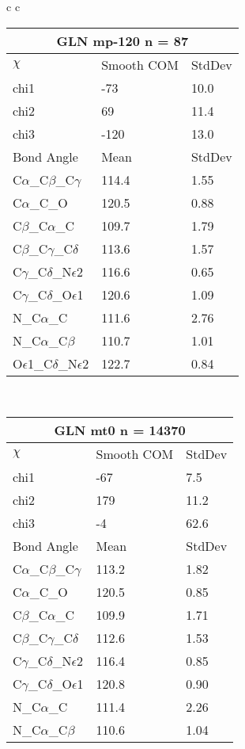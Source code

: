 \begin{longtable}{ c c }
\begin{tabular}{ l l l }
  \multicolumn{3}{c}{GLN \textbf{mp-120} n = 87} \\ \toprule
  $\chi$       & Smooth COM & StdDev \\ \midrule
  chi1 & -73 & 10.0 \\ 
  chi2 & 69 & 11.4 \\ 
  chi3 & -120 & 13.0 \\ \midrule
  Bond Angle   & Mean     & StdDev \\ \midrule
  C$\alpha$\_C$\beta$\_C$\gamma$ & 114.4 & 1.55\\
  C$\alpha$\_C\_O & 120.5 & 0.88\\
  C$\beta$\_C$\alpha$\_C & 109.7 & 1.79\\
  C$\beta$\_C$\gamma$\_C$\delta$ & 113.6 & 1.57\\
  C$\gamma$\_C$\delta$\_N$\epsilon$2 & 116.6 & 0.65\\
  C$\gamma$\_C$\delta$\_O$\epsilon$1 & 120.6 & 1.09\\
  N\_C$\alpha$\_C & 111.6 & 2.76\\
  N\_C$\alpha$\_C$\beta$ & 110.7 & 1.01\\
  O$\epsilon$1\_C$\delta$\_N$\epsilon$2 & 122.7 & 0.84\\
  \bottomrule
  \end{tabular}
  \\
  \begin{tabular}{ l l l }
  \toprule
  \multicolumn{3}{c}{GLN \textbf{mt0} n = 14370} \\ \toprule
  $\chi$       & Smooth COM & StdDev \\ \midrule
  chi1 & -67 & 7.5 \\ 
  chi2 & 179 & 11.2 \\ 
  chi3 & -4 & 62.6 \\ \midrule
  Bond Angle   & Mean     & StdDev \\ \midrule
  C$\alpha$\_C$\beta$\_C$\gamma$ & 113.2 & 1.82\\
  C$\alpha$\_C\_O & 120.5 & 0.85\\
  C$\beta$\_C$\alpha$\_C & 109.9 & 1.71\\
  C$\beta$\_C$\gamma$\_C$\delta$ & 112.6 & 1.53\\
  C$\gamma$\_C$\delta$\_N$\epsilon$2 & 116.4 & 0.85\\
  C$\gamma$\_C$\delta$\_O$\epsilon$1 & 120.8 & 0.90\\
  N\_C$\alpha$\_C & 111.4 & 2.26\\
  N\_C$\alpha$\_C$\beta$ & 110.6 & 1.04\\

\end{tabular}
\end{longtable}
